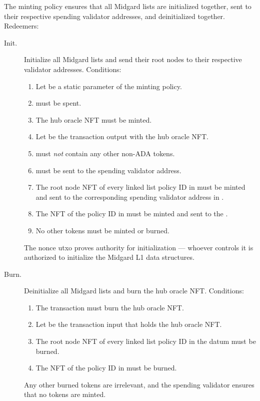 \documentclass[../midgard.tex]{subfiles}
\begin{document}
The  minting policy ensures that all Midgard lists are initialized together, sent to their respective spending validator addresses, and deinitialized together. Redeemers:
\begin{description}
    \item[Init.] Initialize all Midgard lists and send their root nodes to their respective validator addresses. Conditions:
        \begin{enumerate}
            \item Let  be a static parameter of the  minting policy.
            \item {} must be spent.
            \item The hub oracle NFT must be minted.
            \item Let  be the transaction output with the hub oracle NFT.
            \item {} must \emph{not} contain any other non-ADA tokens.
            \item {} must be sent to the  spending validator address.
            \item The root node NFT of every linked list policy ID in  must be minted and sent to the corresponding spending validator address in .
            \item The NFT of the  policy ID in  must be minted and sent to the .
            \item No other tokens must be minted or burned.
        \end{enumerate}
    The nonce utxo proves authority for initialization --- whoever controls it is authorized to initialize the Midgard L1 data structures.
    
    \item[Burn.] Deinitialize all Midgard lists and burn the hub oracle NFT. Conditions:
        \begin{enumerate}
            \item The transaction must burn the hub oracle NFT.
            \item Let  be the transaction input that holds the hub oracle NFT.
            \item The root node NFT of every linked list policy ID in the  datum must be burned.
            \item The NFT of the  policy ID in  must be burned.
        \end{enumerate}
    Any other burned tokens are irrelevant, and the  spending validator ensures that no tokens are minted.
\end{description}
\end{document}
